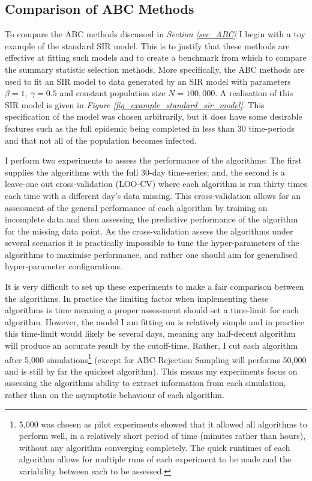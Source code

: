 \documentclass[11pt,a4paper]{article}
\theoremstyle{break}
\begin{document}

\subsection{Comparison of ABC Methods}\label{sec_comparison_of_abc_methods}

  \par To compare the ABC methods discussed in \textit{Section \ref{sec_ABC}} I begin with a toy example of the standard SIR model. This is to justify that these methods are effective at fitting such models and to create a benchmark from which to compare the summary statistic selection methods. More specifically, the ABC methods are used to fit an SIR model to data generated by an SIR model with parameters $\beta=1,\ \gamma=0.5$ and constant population size $N=100,000$. A realisation of this SIR model is given in \textit{Figure \ref{fig_example_standard_sir_model}}. This specification of the model was chosen arbitrarily, but it does have some desirable features such as the full epidemic being completed in less than 30 time-periods and that not all of the population becomes infected.

  \par I perform two experiments to assess the performance of the algorithms: The first supplies the algorithms with the full 30-day time-series; and, the second is a leave-one out cross-validation (LOO-CV) where each algorithm is run thirty times each time with a different day's data missing. This cross-validation allows for an assessment of the general performance of each algorithm by training on incomplete data and then assessing the predictive performance of the algorithm for the missing data point. As the cross-validation assess the algorithms under several scenarios it is practically impossible to tune the hyper-parameters of the algorithms to maximise performance, and rather one should aim for generalised hyper-parameter configurations.

  \par It is very difficult to set up these experiments to make a fair comparison between the algorithms. In practice the limiting factor when implementing these algorithms is time meaning a proper assessment should set a time-limit for each algorithm. However, the model I am fitting on is relatively simple and in practice this time-limit would likely be several days, meaning any half-decent algorithm will produce an accurate result by the cutoff-time. Rather, I cut each algorithm after 5,000 simulations\footnote{5,000 was chosen as pilot experiments showed that it allowed all algorithms to perform well, in a relatively short period of time (minutes rather than hours), without any algorithm converging completely. The quick runtimes of each algorithm allows for multiple runs of each experiment to be made and the variability between each to be assessed.} (except for ABC-Rejection Sampling will performs 50,000 and is still by far the quickest algorithm). This means my experiments focus on assessing the algorithms ability to extract information from each simulation, rather than on the asymptotic behaviour of each algorithm.
\end{document}
